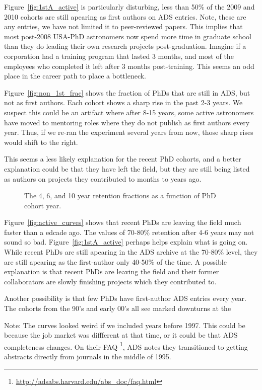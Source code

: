\documentclass{emulateapj}
\begin{document}
Figure~\ref{fig:1stA_active} is particularly disturbing, less than 50\% of the 2009 and 2010 cohorts are still apearing as first authors on ADS entries. Note, these are any entries, we have not limited it to peer-reviewed papers.  This implies that most post-2008 USA-PhD astronomers now spend more time in graduate school than they do leading their own research projects post-graduation. Imagine if a corporation had a training program that lasted 3 months, and most of the employees who completed it left after 3 months post-training.  This seems an odd place in the career path to place a bottleneck.

Figure~\ref{fig:non_1st_frac} shows the fraction of PhDs that are still in ADS, but not as first authors.  Each cohort shows a sharp rise in the past 2-3 years. We suspect this could be an artifact where after 8-15 years, some active astronomers have moved to mentoring roles where they do not publish as first authors every year.  Thus, if we re-ran the experiment several years from now, those sharp rises would shift to the right.

This seems a less likely explanation for the recent PhD cohorts, and a better explanation could be that they have left the field, but they are still being listed as authors on projects they contributed to months to years ago.


\begin{figure}
  \caption{The 4, 6, and 10 year retention fractions as a function of PhD cohort year.\label{fig:retention}}
\end{figure}

Figure~\ref{fig:active_curves} shows that recent PhDs are leaving the field much faster than a edcade ago.  The values of 70-80\% retention after 4-6 years may not sound so bad.  Figure~\ref{fig:1stA_active} perhaps helps explain what is going on. While recent PhDs are still apearing in the ADS archive at the 70-80\% level, they are still apearing as the first-author only 40-50\% of the time. A possible explanation is that recent PhDs are leaving the field and their former collaborators are slowly finishing projects which they contributed to.

Another possibility is that few PhDs have first-author ADS entries every year. The cohorts from the 90's and early 00's all see marked downturns at the

Note:  The curves looked weird if we included years before 1997. This could be because the job market was diffferent at that time, or it could be that ADS completeness changes. On their FAQ \footnote{\url{http://adsabs.harvard.edu/abs\_doc/faq.html}}, ADS notes they transitioned to getting abstracts directly from journals in the middle of 1995.
\end{document}
